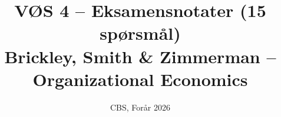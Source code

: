 \usepackage[utf8]{inputenc}
\usepackage[norsk]{babel}
\usepackage{amsmath, amssymb}
\usepackage{booktabs}
\usepackage{longtable}
\usepackage{geometry}
\usepackage{graphicx}
\usepackage{tikz}
\usetikzlibrary{arrows.meta, positioning, decorations.pathreplacing, calc, shapes.geometric, fit}
\usepackage{hyperref}
\usepackage{enumitem}
\usepackage{xcolor}
\usepackage{mdframed}
\usepackage{csquotes}
\usepackage{eurosym}
\usepackage{placeins}
\usepackage{float}
\usepackage[most]{tcolorbox}

\geometry{margin=2.5cm}
\graphicspath{{../extracted_pptx_illustrations/}}

\hypersetup{
  colorlinks=true,
  linkcolor=blue!60!black,
  urlcolor=blue!60!black,
  linktoc=all
}


\newcommand{\SOne}{\textcolor{s1color}{\textbf{[S1]}}}
\newcommand{\STwo}{\textcolor{s2color}{\textbf{[S2]}}}
\newcommand{\SThree}{\textcolor{s3color}{\textbf{[S3]}}}

\newcommand{\thref}[2]{\hyperref[thr:#1]{\underline{#2}}}

\title{VØS 4 -- Eksamensnotater (15 spørsmål)\\
\large Brickley, Smith \& Zimmerman -- Organizational Economics}
\author{}
\date{CBS, Forår 2026}
